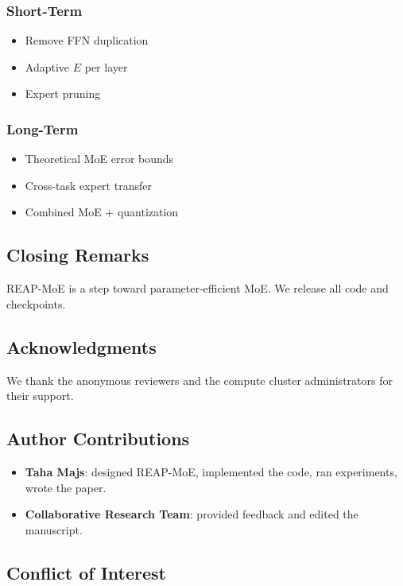\subsubsection{Short-Term}
\begin{itemize}
\item Remove FFN duplication
\item Adaptive $E$ per layer
\item Expert pruning

\end{itemize}
\subsubsection{Long-Term}
\begin{itemize}
\item Theoretical MoE error bounds
\item Cross-task expert transfer
\item Combined MoE + quantization

\end{itemize}
\subsection{Closing Remarks}

REAP-MoE is a step toward parameter-efficient MoE. We release all code and 
checkpoints.

\subsection{Acknowledgments}

We thank the anonymous reviewers and the compute cluster administrators for their support.

\subsection{Author Contributions}

\begin{itemize}
\item \textbf{Taha Majs}: designed REAP-MoE, implemented the code, ran experiments,
  wrote the paper.
\item \textbf{Collaborative Research Team}: provided feedback and edited the manuscript.

\end{itemize}
\subsection{Conflict of Interest}

